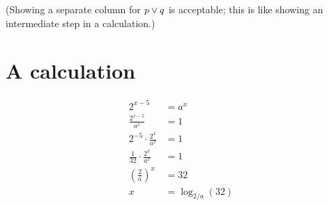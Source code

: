 \documentclass[12pt]{article}
\begin{document}
(Showing a separate column for $p \vee q$ is acceptable; this is like showing an intermediate step in a calculation.)

\section*{A calculation}


\begin{align*}
2^{x - 5} &= a^x \\
\frac{2^{x - 5}}{a^x} &= 1 \\
2^{-5} \cdot \frac{2^x}{a^x} &= 1 \\
\frac{1}{32} \cdot \frac{2^x}{a^x} &= 1 \\
\left( \frac{2}{a} \right)^x &= 32 \\
x &= \log_{2/a} (32)
\end{align*}
\end{document}
